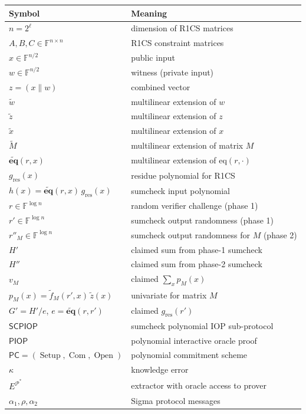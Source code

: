 \documentclass[11pt]{article}
\theoremstyle{plain}
\theoremstyle{definition}
\newcommand{\F}{\mathbb{F}}
\newcommand{\tildew}{\tilde{w}}
\newcommand{\tildeq}{\tilde{\mathbf{eq}}}
\newcommand{\tildez}{\tilde{z}}
\newcommand{\tildex}{\tilde{x}}
\newcommand{\tildeM}{\widetilde{M}}
\DeclareMathOperator{\Setup}{Setup}
\DeclareMathOperator{\Com}{Com}
\DeclareMathOperator{\Open}{Open}
\begin{document}
\begin{center}
\begin{tabular}{ll}
  \hline
  \textbf{Symbol} & \textbf{Meaning} \\
  \hline
  $n = 2^\ell$ & dimension of R1CS matrices \\
  $A, B, C \in \F^{n\times n}$ & R1CS constraint matrices \\
  $x \in \F^{n/2}$ & public input \\
  $w \in \F^{n/2}$ & witness (private input) \\
  $z = (x \| w)$ & combined vector \\
  $\tildew$ & multilinear extension of $w$ \\
  $\tildez$ & multilinear extension of $z$ \\
  $\tildex$ & multilinear extension of $x$ \\
  $\tildeM$ & multilinear extension of matrix $M$ \\
  $\tildeq(r, x)$ & multilinear extension of $\mathrm{eq}(r, \cdot)$ \\
  $g_{\mathrm{res}}(x)$ & residue polynomial for R1CS \\
  $h(x) = \tildeq(r,x)\,g_{\mathrm{res}}(x)$ & sumcheck input polynomial \\
  $r \in \F^{\log n}$ & random verifier challenge (phase 1) \\
  $r' \in \F^{\log n}$ & sumcheck output randomness (phase 1) \\
  $r''_M \in \F^{\log n}$ & sumcheck output randomness for $M$ (phase 2) \\
  $H'$ & claimed sum from phase-1 sumcheck \\
  $H''$ & claimed sum from phase-2 sumcheck \\
  $v_M$ & claimed $\sum_x p_M(x)$ \\
  $p_M(x) = \tilde{f}_M(r',x)\,\tildez(x)$ & univariate for matrix $M$ \\
  $G' = H'/e$, $e = \tildeq(r,r')$ & claimed $g_{\mathrm{res}}(r')$ \\
  $\mathsf{SCPIOP}$ & sumcheck polynomial IOP sub-protocol \\
  $\mathsf{PIOP}$ & polynomial interactive oracle proof \\
  $\mathsf{PC} = (\Setup, \Com, \Open)$ & polynomial commitment scheme \\
  $\kappa$ & knowledge error \\
  $E^{\mathcal{P}^*}$ & extractor with oracle access to prover \\
  $\alpha_1, \rho, \alpha_2$ & Sigma protocol messages \\
  \hline
\end{tabular}
\end{center}
\end{document}
